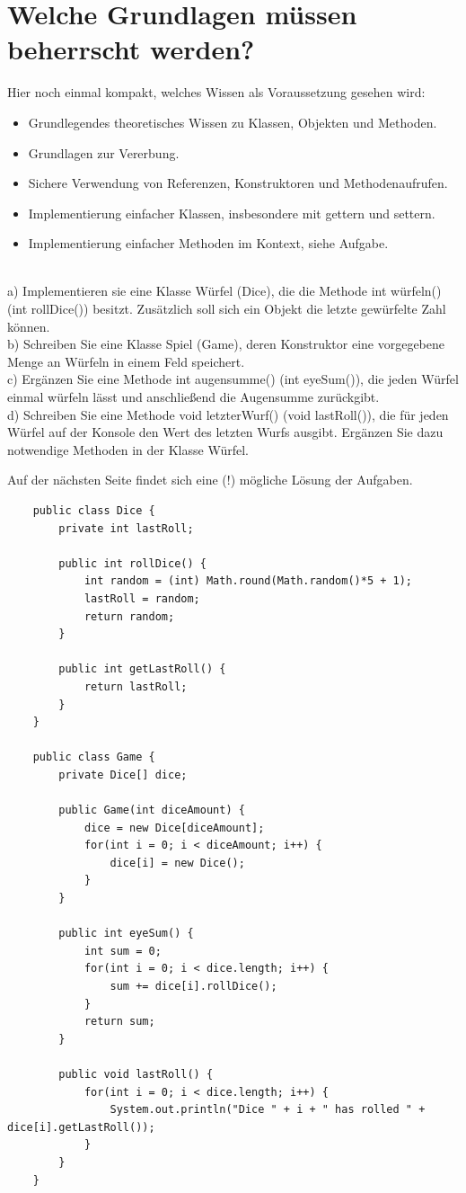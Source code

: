 \documentclass{article}
\begin{document}
\section{Welche Grundlagen müssen beherrscht werden?}
Hier noch einmal kompakt, welches Wissen als Voraussetzung gesehen wird:
\begin{itemize}
    \item Grundlegendes theoretisches Wissen zu Klassen, Objekten und Methoden.
    \item Grundlagen zur Vererbung.
    \item Sichere Verwendung von Referenzen, Konstruktoren und Methodenaufrufen. 
    \item Implementierung einfacher Klassen, insbesondere mit gettern und settern.
    \item Implementierung einfacher Methoden im Kontext, siehe Aufgabe.
\end{itemize}

\begin{task}{3}
    \\
a) Implementieren sie eine Klasse Würfel (Dice), die die Methode int würfeln() (int rollDice()) besitzt. Zusätzlich soll sich ein Objekt die letzte gewürfelte Zahl  können. \\
b) Schreiben Sie eine Klasse Spiel (Game), deren Konstruktor eine vorgegebene Menge an Würfeln in einem Feld speichert. \\
c) Ergänzen Sie eine Methode int augensumme() (int eyeSum()), die jeden Würfel einmal würfeln lässt und anschließend die Augensumme zurückgibt. \\
d) Schreiben Sie eine Methode void letzterWurf() (void lastRoll()), die für jeden Würfel auf der Konsole den Wert des letzten Wurfs ausgibt. Ergänzen Sie dazu notwendige Methoden in der Klasse Würfel. 
\end{task}
Auf der nächsten Seite findet sich eine (!) mögliche Lösung der Aufgaben.
\newpage

\begin{verbatim}
    public class Dice {
        private int lastRoll; 

        public int rollDice() {
            int random = (int) Math.round(Math.random()*5 + 1);
            lastRoll = random;
            return random;
        }

        public int getLastRoll() {
            return lastRoll;
        }
    }

    public class Game {
        private Dice[] dice;

        public Game(int diceAmount) {
            dice = new Dice[diceAmount];
            for(int i = 0; i < diceAmount; i++) {
                dice[i] = new Dice();
            }
        }

        public int eyeSum() {
            int sum = 0;
            for(int i = 0; i < dice.length; i++) {
                sum += dice[i].rollDice();
            }
            return sum;
        }

        public void lastRoll() {
            for(int i = 0; i < dice.length; i++) {
                System.out.println("Dice " + i + " has rolled " + dice[i].getLastRoll());
            }
        }
    }
\end{verbatim}
\end{document}
